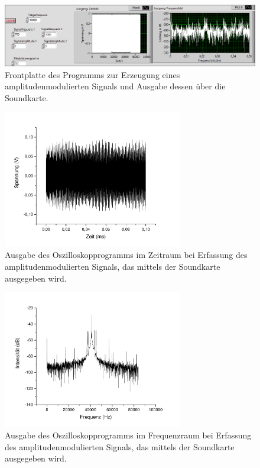 \documentclass[
a4paper,
12pt,
pagesize,
ngerman
]{scrartcl}
\begin{document}
	\begin{figure}[H]  
		\includegraphics[width=1\textwidth]{EIRE2018Dateien/Tag3/Soundkarteoutoszi/AMp}
		\centering
		\caption{
			Frontplatte des Programms zur Erzeugung eines amplitudenmodulierten Signals und Ausgabe dessen über die Soundkarte.
		}
		\label{fig_tag3_am_soundkarte_front}
		\centering
	\end{figure}

	\begin{figure}[H]  
		\includegraphics[width=0.7\textwidth]{Origin-Files/AM-Zeit}
		\centering
		\caption{
			Ausgabe des Oszilloskopprogramms im Zeitraum bei Erfassung des amplitudenmodulierten Signals, das mittels der Soundkarte ausgegeben wird.
		}
		\label{fig_tag3_am_soundkarte_zeit}
		\centering
	\end{figure}
	
	\begin{figure}[H]  
		\includegraphics[width=0.7\textwidth]{Origin-Files/AM-Freq-Hann}
		\centering
		\caption{
			Ausgabe des Oszilloskopprogramms im Frequenzraum bei Erfassung des amplitudenmodulierten Signals, das mittels der Soundkarte ausgegeben wird.
		}
		\label{fig_tag3_am_soundkarte_freq}
		\centering
	\end{figure}
\end{document}
